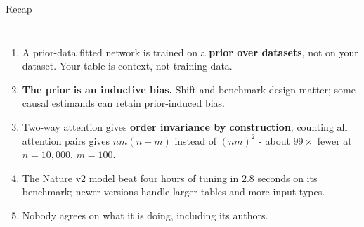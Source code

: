 \documentclass[aspectratio=169]{beamer}
\begin{document}
\begin{frame}{Recap}
  \small
  \begin{columns}[T]
    \begin{enumerate}\footnotesize\itemsep 3pt
      \item A prior-data fitted network is trained on a \textbf{prior over datasets}, not on
        your dataset. Your table is context, not training data.
      \item \textbf{The prior is an inductive bias.} Shift and benchmark design matter;
        some causal estimands can retain prior-induced bias.
      \item Two-way attention gives \textbf{order invariance by construction}; counting all
        attention pairs gives $nm(n+m)$ instead of $(nm)^2$ - about $99\times$ fewer at
        $n{=}10{,}000$, $m{=}100$.
      \item The Nature v2 model beat four hours of tuning in 2.8 seconds on its benchmark;
        newer versions handle larger tables and more input types.
      \item Nobody agrees on what it is doing, including its authors.
    \end{enumerate}
    \vskip 10pt
    \vskip 5pt
  \end{columns}
\end{frame}
\end{document}
